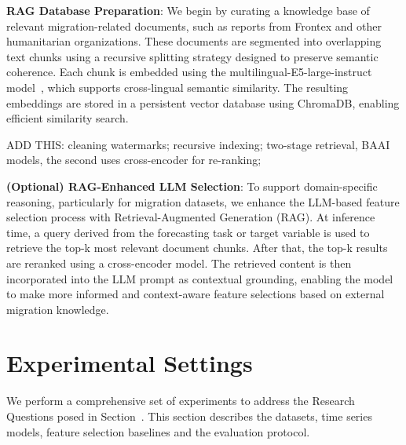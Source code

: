 \documentclass[conference]{IEEEtran}
\newcommand{\fm}[1]{\textcolor{magenta}{FM: #1}}
\begin{document}
\textbf{RAG Database Preparation}: We begin by curating a knowledge base of relevant migration-related documents, such as reports from Frontex and other humanitarian organizations. These documents are segmented into overlapping text chunks using a recursive splitting strategy designed to preserve semantic coherence. Each chunk is embedded using the multilingual-E5-large-instruct model~\cite{wang2024multilingual}, which supports cross-lingual semantic similarity. The resulting embeddings are stored in a persistent vector database using ChromaDB, enabling efficient similarity search. 

ADD THIS: cleaning watermarks; recursive indexing; two-stage retrieval, BAAI models, the second uses cross-encoder for re-ranking;

\noindent\textbf{(Optional) RAG-Enhanced LLM Selection}: To support domain-specific reasoning, particularly for migration datasets, we enhance the LLM-based feature selection process with Retrieval-Augmented Generation (RAG). At inference time, a query derived from the forecasting task or target variable is used to retrieve the top-k most relevant document chunks. After that, the top-k results are reranked using a cross-encoder model. The retrieved content is then incorporated into the LLM prompt as contextual grounding, enabling the model to make more informed and context-aware feature selections based on external migration knowledge.\\


\section{Experimental Settings}\label{sec:experiments}





We perform a comprehensive set of experiments to address the Research Questions posed in Section~\label{sec:intro}. This section describes the datasets, time series models, feature selection baselines and the evaluation protocol.
\end{document}
